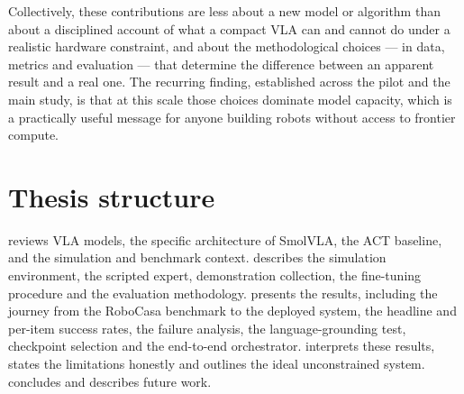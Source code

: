 Collectively, these contributions are less about a new model or algorithm than about
a disciplined account of what a compact VLA can and cannot do under a realistic
hardware constraint, and about the methodological choices --- in data, metrics and
evaluation --- that determine the difference between an apparent result and a real one.
The recurring finding, established across the pilot and the main study, is that at this
scale those choices dominate model capacity, which is a practically useful message for
anyone building robots without access to frontier compute.

\section{Thesis structure}
\label{sec:structure}
 reviews VLA models, the specific architecture of
SmolVLA, the ACT baseline, and the simulation and benchmark context.
 describes the simulation environment, the scripted
expert, demonstration collection, the fine-tuning procedure and the evaluation
methodology.  presents the results, including the journey
from the RoboCasa benchmark to the deployed system, the headline and per-item
success rates, the failure analysis, the language-grounding test, checkpoint
selection and the end-to-end orchestrator.  interprets
these results, states the limitations honestly and outlines the ideal
unconstrained system.  concludes and describes future
work.
